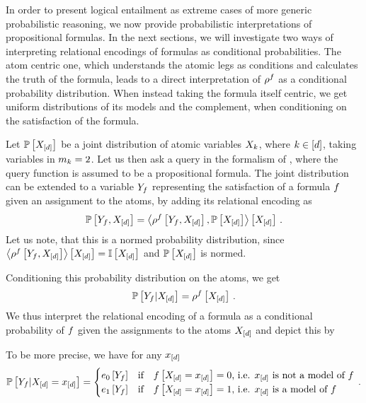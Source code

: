 In order to present logical entailment as extreme cases of more generic probabilistic reasoning, we now provide probabilistic interpretations of propositional formulas.
In the next sections, we will investigate two ways of interpreting relational encodings of formulas as conditional probabilities.
The atom centric one, which understands the atomic legs as conditions and calculates the truth of the formula, leads to a direct interpretation of $\rho^{f}$ as a conditional probability distribution.
When instead taking the formula itself centric, we get uniform distributions of its models and the complement, when conditioning on the satisfaction of the formula.


Let $\mathbb{P}\left[X_{[d]}\right]$ be a joint distribution of atomic variables $X_{k}$, where $k\in[d]$, taking variables in $m_{k}=2$.
Let us then ask a query in the formalism of , where the query function is assumed to be a propositional formula.
The joint distribution can be extended to a variable $Y_{f}$ representing the satisfaction of a formula $f$ given an assignment to the atoms, by adding its relational encoding as
\begin{align*}
    \mathbb{P}\left[Y_{f},X_{[d]}\right]
    = \left\langle \rho^{f}\left[Y_{f},X_{[d]}\right],\mathbb{P}\left[X_{[d]}\right]\right\rangle \left[ X_{[d]} \right] \, .
\end{align*}
Let us note, that this is a normed probability distribution, since $\left\langle \rho^{f}\left[Y_{f},X_{[d]}\right]\right\rangle \left[ X_{[d]} \right]=\mathbb{I}\left[X_{[d]}\right]$ and $\mathbb{P}\left[X_{[d]}\right]$ is normed.

Conditioning this probability distribution on the atoms, we get
\begin{align*}
    \mathbb{P}\left[Y_{f}|X_{[d]}\right]
    = \rho^{f}\left[X_{[d]}\right] \, .
\end{align*}
We thus interpret the relational encoding of a formula as a conditional probability of $f$ given the assignments to the atoms $X_{[d]}$ and depict this by
\begin{center}
    
\end{center}
To be more precise, we have for any $x_{[d]}$
\begin{align*}
    \mathbb{P}\left[Y_{f}|X_{[d]}=x_{[d]}\right] =
    \begin{cases}
        e_0\left[Y_{f}\right] & \text{if} \quad f\left[X_{[d]}=x_{[d]}\right] = 0 \text{, i.e. $x_{[d]}$ is not a model of $f$} \\
        e_1\left[Y_{f}\right] & \text{if} \quad f\left[X_{[d]}=x_{[d]}\right] = 1 \text{, i.e. $x_{[d]}$ is a model of $f$}
    \end{cases} \, .
\end{align*}

